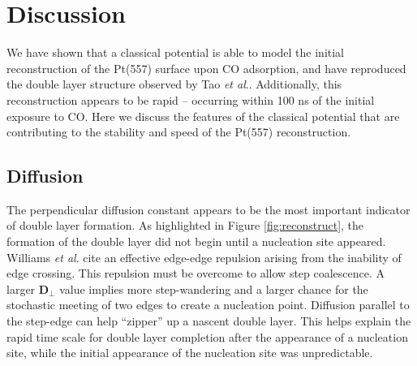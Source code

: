 \documentclass[journal = jpccck, manuscript = article]{achemso}
\begin{document}
\section{Discussion}
We have shown that a classical potential is able to model the initial
reconstruction of the Pt(557) surface upon CO adsorption, and have
reproduced the double layer structure observed by Tao {\it et
  al}.\cite{Tao:2010}. Additionally, this reconstruction appears to be
rapid -- occurring within 100 ns of the initial exposure to CO.  Here
we discuss the features of the classical potential that are
contributing to the stability and speed of the Pt(557) reconstruction.

\subsection{Diffusion}
The perpendicular diffusion constant appears to be the most important
indicator of double layer formation. As highlighted in Figure
\ref{fig:reconstruct}, the formation of the double layer did not begin
until a nucleation site appeared.  Williams {\it et
  al}.\cite{Williams:1991,Williams:1994} cite an effective edge-edge
repulsion arising from the inability of edge crossing.  This repulsion
must be overcome to allow step coalescence.  A larger
$\textbf{D}_\perp$ value implies more step-wandering and a larger
chance for the stochastic meeting of two edges to create a nucleation
point.  Diffusion parallel to the step-edge can help ``zipper'' up a
nascent double layer. This helps explain the rapid time scale for
double layer completion after the appearance of a nucleation site, while
the initial appearance of the nucleation site was unpredictable.
\end{document}
